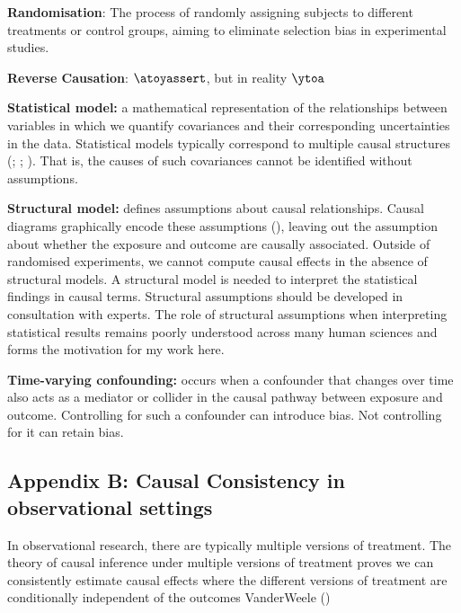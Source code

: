 \documentclass[
  singlecolumn]{article}
\begin{document}
\textbf{Randomisation}: The process of randomly assigning subjects to
different treatments or control groups, aiming to eliminate selection
bias in experimental studies.

\textbf{Reverse Causation}: \(\atoyassert\), but in reality \(\ytoa\)

\textbf{Statistical model:} a mathematical representation of the
relationships between variables in which we quantify covariances and
their corresponding uncertainties in the data. Statistical models
typically correspond to multiple causal structures
(;
;
).
That is, the causes of such covariances cannot be identified without
assumptions.

\textbf{Structural model:} defines assumptions about causal
relationships. Causal diagrams graphically encode these assumptions
(), leaving out the
assumption about whether the exposure and outcome are causally
associated. Outside of randomised experiments, we cannot compute causal
effects in the absence of structural models. A structural model is
needed to interpret the statistical findings in causal terms. Structural
assumptions should be developed in consultation with experts. The role
of structural assumptions when interpreting statistical results remains
poorly understood across many human sciences and forms the motivation
for my work here.

\textbf{Time-varying confounding:} occurs when a confounder that changes
over time also acts as a mediator or collider in the causal pathway
between exposure and outcome. Controlling for such a confounder can
introduce bias. Not controlling for it can retain bias.

\subsection{Appendix B: Causal Consistency in observational
settings}\label{appendix-b-causal-consistency-in-observational-settings}

In observational research, there are typically multiple versions of
treatment. The theory of causal inference under multiple versions of
treatment proves we can consistently estimate causal effects where the
different versions of treatment are conditionally independent of the
outcomes VanderWeele ()
\end{document}
